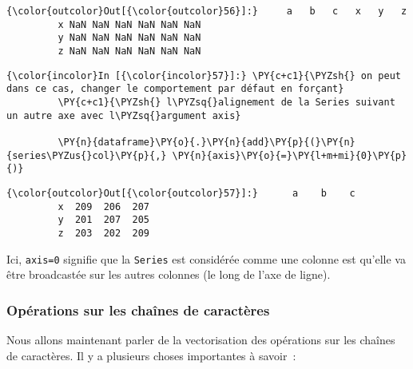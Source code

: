\begin{Verbatim}[commandchars=\\\{\}]
{\color{outcolor}Out[{\color{outcolor}56}]:}     a   b   c   x   y   z
         x NaN NaN NaN NaN NaN NaN
         y NaN NaN NaN NaN NaN NaN
         z NaN NaN NaN NaN NaN NaN
\end{Verbatim}
            
    \begin{Verbatim}[commandchars=\\\{\}]
{\color{incolor}In [{\color{incolor}57}]:} \PY{c+c1}{\PYZsh{} on peut dans ce cas, changer le comportement par défaut en forçant}
         \PY{c+c1}{\PYZsh{} l\PYZsq{}alignement de la Series suivant un autre axe avec l\PYZsq{}argument axis}
         
         \PY{n}{dataframe}\PY{o}{.}\PY{n}{add}\PY{p}{(}\PY{n}{series\PYZus{}col}\PY{p}{,} \PY{n}{axis}\PY{o}{=}\PY{l+m+mi}{0}\PY{p}{)}
\end{Verbatim}


\begin{Verbatim}[commandchars=\\\{\}]
{\color{outcolor}Out[{\color{outcolor}57}]:}      a    b    c
         x  209  206  207
         y  201  207  205
         z  203  202  209
\end{Verbatim}
            
    Ici, \texttt{axis=0} signifie que la \texttt{Series} est considérée
comme une colonne est qu'elle va être broadcastée sur les autres
colonnes (le long de l'axe de ligne).

    \hypertarget{opuxe9rations-sur-les-chauxeenes-de-caractuxe8res}{%
\subsubsection{Opérations sur les chaînes de
caractères}\label{opuxe9rations-sur-les-chauxeenes-de-caractuxe8res}}

    Nous allons maintenant parler de la vectorisation des opérations sur les
chaînes de caractères. Il y a plusieurs choses importantes à savoir~:


